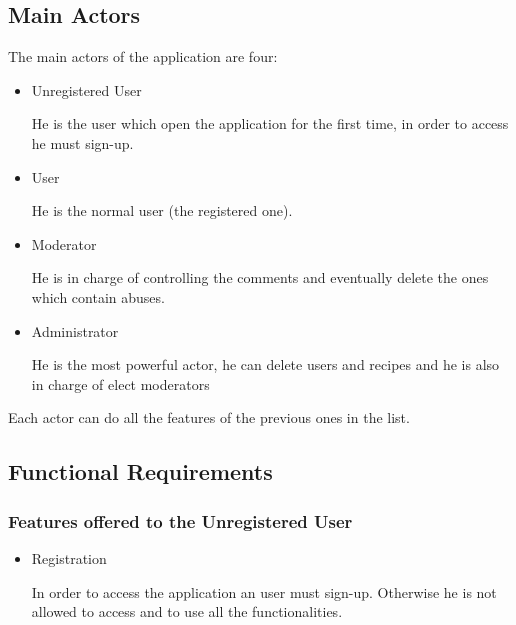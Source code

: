 \documentclass[a4paper]{report}
\begin{document}
\subsection{Main Actors}
The main actors of the application are four:
\begin{itemize}
	\item Unregistered User
	
	\noindent He is the user which open the application for the first time, in order to access he must sign-up.
	
	\item User
	
	\noindent He is the normal user (the registered one).
	
	\item Moderator
	
	\noindent He is in charge of controlling the comments and eventually delete the ones which contain abuses.
	
	\item Administrator
	
	\noindent He is the most powerful actor, he can delete users and recipes and he is also in charge of elect moderators
\end{itemize}

\noindent Each actor can do all the features of the previous ones in the list.

\subsection{Functional Requirements}
\subsubsection{Features offered to the Unregistered User}
\begin{itemize}
	\item  Registration
	
	\noindent In order to access the application an user must sign-up. Otherwise he is not allowed to access and to use all the functionalities.
\end{itemize}
\end{document}
